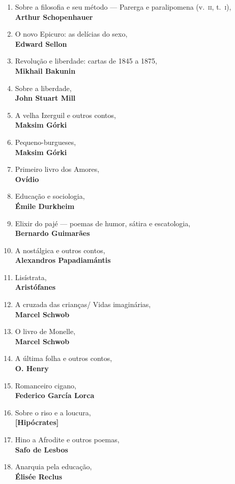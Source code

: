 \begin{enumerate} [font=\Formular\footnotesize]
\item Sobre a filosofia e seu método --- Parerga e paralipomena (v.~\textsc{ii}, t.~\textsc{i}),\\ \textbf{Arthur Schopenhauer} 
\item O novo Epicuro: as delícias do sexo,\\ \textbf{Edward Sellon}
\item Revolução e liberdade: cartas de 1845 a 1875,\\ \textbf{Mikhail Bakunin}
\item Sobre a liberdade,\\ \textbf{John Stuart Mill}
\item A velha Izerguil e outros contos,\\ \textbf{Maksim Górki}
\item Pequeno-burgueses,\\ \textbf{Maksim Górki}
\item Primeiro livro dos Amores,\\ \textbf{Ovídio}
\item Educação e sociologia,\\ \textbf{Émile Durkheim}
\item Elixir do pajé --- poemas de humor, sátira e escatologia,\\ \textbf{Bernardo Guimarães}
\item A nostálgica e outros contos,\\ \textbf{Alexandros Papadiamántis}
\item Lisístrata,\\ \textbf{Aristófanes}
\item A cruzada das crianças/ Vidas imaginárias,\\ \textbf{Marcel Schwob}
\item O livro de Monelle,\\ \textbf{Marcel Schwob}
\item A última folha e outros contos,\\ \textbf{O. Henry}
\item Romanceiro cigano,\\ \textbf{Federico García Lorca}
\item Sobre o riso e a loucura,\\ \textbf{{[}Hipócrates{]}}
\item Hino a Afrodite e outros poemas,\\ \textbf{Safo de Lesbos}
\item Anarquia pela educação,\\ \textbf{Élisée Reclus}

\end{enumerate}
